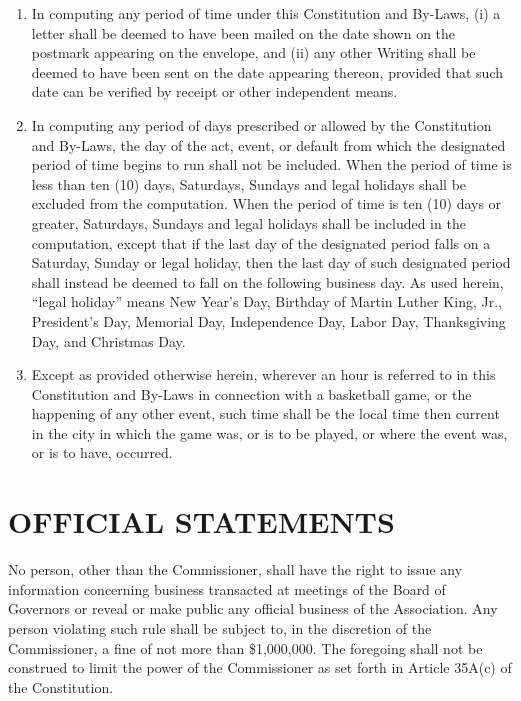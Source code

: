 \documentclass[]{book}
\providecommand{\tightlist}{%
  \setlength{\itemsep}{0pt}\setlength{\parskip}{0pt}}
\begin{document}
\begin{enumerate}
\def\labelenumi{(\alph{enumi})}
\tightlist
\item
  In computing any period of time under this Constitution and By-Laws, (i) a letter shall be deemed to have been mailed on the date shown on the postmark appearing on the envelope, and (ii) any other Writing shall be deemed to have been sent on the date appearing thereon, provided that such date can be verified by receipt or other independent means.
\item
  In computing any period of days prescribed or allowed by the Constitution and By-Laws, the day of the act, event, or default from which the designated period of time begins to run shall not be included. When the period of time is less than ten (10) days, Saturdays, Sundays and legal holidays shall be excluded from the computation. When the period of time is ten (10) days or greater, Saturdays, Sundays and legal holidays shall be included in the computation, except that if the last day of the designated period falls on a Saturday, Sunday or legal holiday, then the last day of such designated period shall instead be deemed to fall on the following business day. As used herein, ``legal holiday'' means New Year's Day, Birthday of Martin Luther King, Jr., President's Day, Memorial Day, Independence Day, Labor Day, Thanksgiving Day, and Christmas Day.
\item
  Except as provided otherwise herein, wherever an hour is referred to in this Constitution and By-Laws in connection with a basketball game, or the happening of any other event, such time shall be the local time then current in the city in which the game was, or is to be played, or where the event was, or is to have, occurred.
\end{enumerate}

\hypertarget{official-statements}{%
\section{OFFICIAL STATEMENTS}\label{official-statements}}

No person, other than the Commissioner, shall have the right to issue any information concerning business transacted at meetings of the Board of Governors or reveal or make public any official business of the Association. Any person violating such rule shall be subject to, in the discretion of the Commissioner, a fine of not more than \$1,000,000. The foregoing shall not be construed to limit the power of the Commissioner as set forth in Article 35A(c) of the Constitution.
\end{document}
